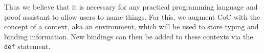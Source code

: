 \documentclass{article}
\begin{document}
Thus we believe that it is necessary for any practical programming language and
proof assistant to allow users to name things.
For this, we augment CoC with the concept of a context, aka an environment,
which will be used to store typing and binding information.
New bindings can then be added to these contexts via the \texttt{def} statement.






\end{document}

